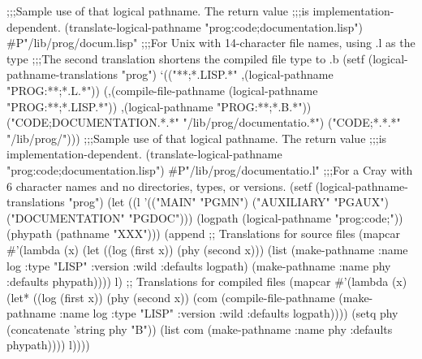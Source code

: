  ;;;Sample use of that logical pathname.  The return value
 ;;;is implementation-dependent.          
 (translate-logical-pathname "prog:code;documentation.lisp")
\EV #P"/lib/prog/docum.lisp"
\medbreak
 ;;;For Unix with 14-character file names, using .l as the type
 ;;;The second translation shortens the compiled file type to .b
 (setf (logical-pathname-translations "prog")
       `(("**;*.LISP.*"            ,(logical-pathname "PROG:**;*.L.*"))
         (,(compile-file-pathname (logical-pathname "PROG:**;*.LISP.*"))
                                   ,(logical-pathname "PROG:**;*.B.*"))
         ("CODE;DOCUMENTATION.*.*" "/lib/prog/documentatio.*")
         ("CODE;*.*.*"             "/lib/prog/")))
\smallbreak
 ;;;Sample use of that logical pathname.  The return value
 ;;;is implementation-dependent.          
 (translate-logical-pathname "prog:code;documentation.lisp")
\EV #P"/lib/prog/documentatio.l"
\medbreak
 ;;;For a Cray with 6 character names and no directories, types, or versions.
 (setf (logical-pathname-translations "prog")
       (let ((l '(("MAIN" "PGMN")
                  ("AUXILIARY" "PGAUX")
                  ("DOCUMENTATION" "PGDOC")))
             (logpath (logical-pathname "prog:code;"))
             (phypath (pathname "XXX")))
         (append
           ;; Translations for source files
           (mapcar #'(lambda (x)
                       (let ((log (first x))
                             (phy (second x)))
                         (list (make-pathname :name log
                                              :type "LISP"
                                              :version :wild
                                              :defaults logpath)
                               (make-pathname :name phy
                                              :defaults phypath))))
                   l)
           ;; Translations for compiled files
           (mapcar #'(lambda (x)
                       (let* ((log (first x))
                              (phy (second x))
                              (com (compile-file-pathname
                                     (make-pathname :name log
                                                    :type "LISP"
                                                    :version :wild
                                                    :defaults logpath))))
                         (setq phy (concatenate 'string phy "B"))
                         (list com
                               (make-pathname :name phy
                                              :defaults phypath))))
                   l))))

